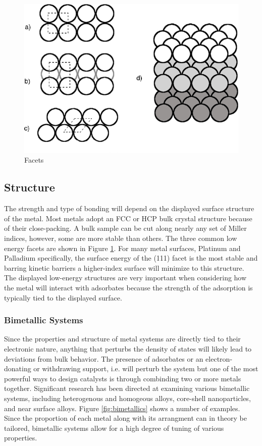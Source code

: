 \begin{figure}
  \includegraphics[width=\linewidth]{../figures/chap1/facets.pdf}
  \caption{Facets}
\label{fig:facets}
\end{figure}

\subsection{Structure}
The strength and type of bonding will depend on the displayed surface structure
of the metal.  Most metals adopt an FCC or HCP bulk crystal structure because
of their close-packing. A bulk sample can be cut along nearly any set of Miller
indices, however, some are more stable than others.  The three common low
energy facets are shown in Figure \ref{fig:facets}. For many metal surfaces,
Platinum and Palladium specifically, the surface energy of the (111) facet is
the most stable and barring kinetic barriers a higher-index surface will
minimize to this structure. The displayed low-energy structures are very
important when considering how the metal will interact with adsorbates because
the strength of the adsorption is typically tied to the displayed surface.

\subsubsection{Bimetallic Systems}
Since the properties and structure of metal systems are directly tied to their
electronic nature, anything that perturbs the density of states will likely
lead to deviations from bulk behavior. The presence of adsorbates or an
electron-donating or withdrawing support, i.e.  will perturb the
system but one of the most powerful ways to design catalysts is through
combinding two or more metals together. Significant research has been directed
at examining various bimetallic systems, including heterogenous and homogeous
alloys, core-shell nanoparticles, and near surface alloys. Figure
\ref{fig:bimetallics} shows a number of examples. Since the proportion of each
metal along with its arrangment can in theory be tailored, bimetallic systems
allow for a high degree of tuning of various properties.

